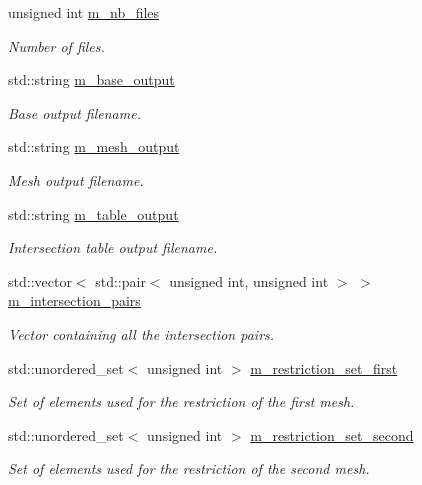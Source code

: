 \begin{DoxyCompactItemize}
unsigned int \hyperlink{classcarl_1_1_stitch___meshes_a01c131c2e0c83ef1642326f6ea4f97d2}{m\+\_\+nb\+\_\+files}
\begin{DoxyCompactList}\small\item\em Number of files. \end{DoxyCompactList}\item 
std\+::string \hyperlink{classcarl_1_1_stitch___meshes_a62dc54f7822611da525d10a57595f898}{m\+\_\+base\+\_\+output}
\begin{DoxyCompactList}\small\item\em Base output filename. \end{DoxyCompactList}\item 
std\+::string \hyperlink{classcarl_1_1_stitch___meshes_ad3f001d09c6d65ab836b2f0e96d9ee64}{m\+\_\+mesh\+\_\+output}
\begin{DoxyCompactList}\small\item\em Mesh output filename. \end{DoxyCompactList}\item 
std\+::string \hyperlink{classcarl_1_1_stitch___meshes_a306da20eddb64d29bb1f7b50c4b45a5e}{m\+\_\+table\+\_\+output}
\begin{DoxyCompactList}\small\item\em Intersection table output filename. \end{DoxyCompactList}\item 
std\+::vector$<$ std\+::pair$<$ unsigned int, unsigned int $>$ $>$ \hyperlink{classcarl_1_1_stitch___meshes_ac2d5619dc617ae411c3c97c130522e29}{m\+\_\+intersection\+\_\+pairs}
\begin{DoxyCompactList}\small\item\em Vector containing all the intersection pairs. \end{DoxyCompactList}\item 
std\+::unordered\+\_\+set$<$ unsigned int $>$ \hyperlink{classcarl_1_1_stitch___meshes_a60ffa9c7303b4c3833d5a0df2ee5e7f5}{m\+\_\+restriction\+\_\+set\+\_\+first}
\begin{DoxyCompactList}\small\item\em Set of elements used for the restriction of the first mesh. \end{DoxyCompactList}\item 
std\+::unordered\+\_\+set$<$ unsigned int $>$ \hyperlink{classcarl_1_1_stitch___meshes_acb37d0d65327137309fa5b7815e4b71a}{m\+\_\+restriction\+\_\+set\+\_\+second}
\begin{DoxyCompactList}\small\item\em Set of elements used for the restriction of the second mesh. \end{DoxyCompactList}\item 

\end{DoxyCompactItemize}
